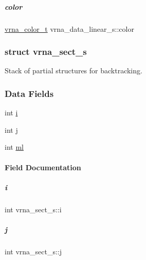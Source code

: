 \mbox{\label{group__data__structures_a7f6d42e6f48694588f26f19ff7741658}} 
\subparagraph{\texorpdfstring{color}{color}}
{\footnotesize\ttfamily \mbox{\hyperlink{group__data__structures_gaed93ddf2ef6b26141a89f9a65b9426b9}{vrna\+\_\+color\+\_\+t}} vrna\+\_\+data\+\_\+linear\+\_\+s\+::color}

\label{structvrna__sect__s}
\subsubsection{struct vrna\+\_\+sect\+\_\+s}
Stack of partial structures for backtracking. \subsubsection*{Data Fields}
\begin{DoxyCompactItemize}
\item 
int \mbox{\hyperlink{group__data__structures_afe4556fdd4c991ce07e025623774fbde}{i}}
\item 
int \mbox{\hyperlink{group__data__structures_a3698df1a69b4e9b4d6299f3cfc52479f}{j}}
\item 
int \mbox{\hyperlink{group__data__structures_a25b6b41468a46ee9ce5115109d70a1c2}{ml}}
\end{DoxyCompactItemize}


\paragraph{Field Documentation}
\mbox{\label{group__data__structures_afe4556fdd4c991ce07e025623774fbde}} 
\subparagraph{\texorpdfstring{i}{i}}
{\footnotesize\ttfamily int vrna\+\_\+sect\+\_\+s\+::i}

\mbox{\label{group__data__structures_a3698df1a69b4e9b4d6299f3cfc52479f}} 
\subparagraph{\texorpdfstring{j}{j}}
{\footnotesize\ttfamily int vrna\+\_\+sect\+\_\+s\+::j}

